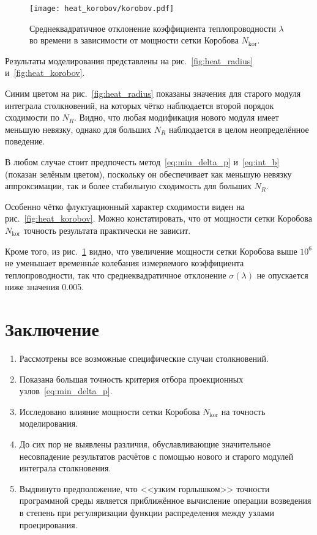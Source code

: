 \documentclass[english,russian,a4paper,12pt]{article}
\begin{document}
\begin{figure}[ht]
	\centering
	\texttt{[image: heat\_korobov/korobov.pdf]}
	\caption{Среднеквадратичное отклонение коэффициента теплопроводности \(\lambda\) во времени
		в зависимости от мощности сетки Коробова \(N_\mathrm{kor}\).}
	\label{fig:var_korobov}
\end{figure}

Результаты моделирования представлены на рис.~\ref{fig:heat_radius} и~\ref{fig:heat_korobov}.

Синим цветом на рис.~\ref{fig:heat_radius} показаны значения для старого модуля интеграла столкновений,
на которых чётко наблюдается второй порядок сходимости по \(N_R\).
Видно, что любая модификация нового модуля имеет меньшую невязку,
однако для больших \(N_R\) наблюдается в целом неопределённое поведение.

В любом случае стоит предпочесть метод~\eqref{eq:min_delta_p} и~\eqref{eq:int_b} (показан зелёным цветом),
поскольку он обеспечивает как меньшую невязку аппроксимации, так и более стабильную сходимость для больших \(N_R\).

Особенно чётко флуктуационный характер сходимости виден на рис.~\ref{fig:heat_korobov}.
Можно констатировать, что от мощности сетки Коробова \(N_\mathrm{kor}\) точность результата
практически не зависит.

Кроме того, из рис.~\ref{fig:var_korobov} видно, что увеличение мощности сетки Коробова выше \(10^6\)
не уменьшает временн\'{ы}е колебания измеряемого коэффициента теплопроводности,
так что среднеквадратичное отклонение \(\sigma(\lambda)\) не опускается ниже значения 0.005.

\section{Заключение}

\begin{enumerate}
	\item Рассмотрены все возможные специфические случаи столкновений.
	\item Показана большая точность критерия отбора проекционных узлов~\eqref{eq:min_delta_p}.
	\item Исследовано влияние мощности сетки Коробова \(N_\mathrm{kor}\) на точность моделирования.
	\item До сих пор не выявлены различия, обуславливающие значительное несовпадение результатов расчётов с помощью
	нового и старого модулей интеграла столкновения.
	\item Выдвинуто предположение, что <<узким горлышком>> точности программной среды является
	приближённое вычисление операции возведения в степень при регуляризации функции распределения
	между узлами проецирования.
\end{enumerate}
\end{document}
